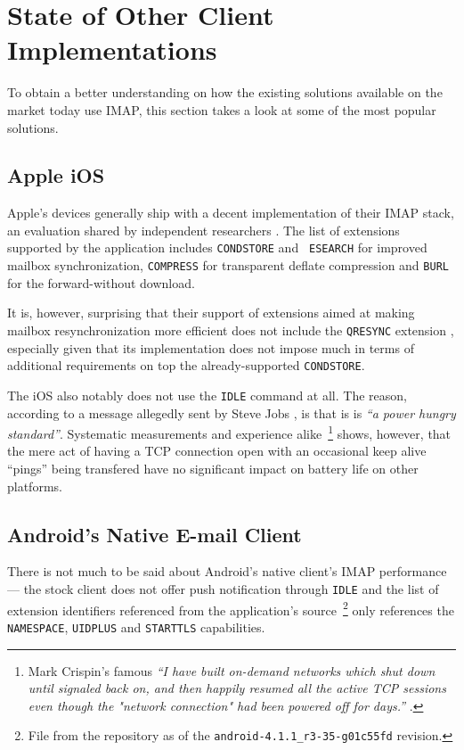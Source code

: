 \documentclass[trojita]{subfiles}
\begin{document}
\section{State of Other Client Implementations}

To obtain a better understanding on how the existing solutions available on the market today use IMAP, this section
takes a look at some of the most popular solutions.

\subsection{Apple iOS}

Apple's devices generally ship with a decent implementation of their IMAP stack, an evaluation shared by independent
researchers \cite{isode-iphone4}.  The list of extensions supported by the application includes {\tt CONDSTORE} and {\tt
ESEARCH} for improved mailbox synchronization, {\tt COMPRESS} for transparent deflate compression and {\tt BURL} for the
forward-without download.

It is, however, surprising that their support of extensions aimed at making mailbox resynchronization more efficient
does not include the {\tt QRESYNC} extension \cite{rfc5162}, especially given that its implementation does not impose
much in terms of additional requirements on top the already-supported {\tt CONDSTORE}.

The iOS also notably does not use the {\tt IDLE} command at all.  The reason, according to a message allegedly sent by
Steve Jobs \cite{jobs-ios-idle}, is that is is {\em ``a power hungry standard''}.  Systematic measurements
\cite{wcdma-energy} \cite{cridland-fach-dch-measurements} and experience alike~\footnote{Mark Crispin's famous {\em ``I
have built on-demand networks which shut down until signaled back on, and then happily resumed all the active TCP
sessions even though the "network connection" had been powered off for days.''} \cite{crispin-no-ifup}.} shows, however,
that the mere act of having a TCP connection open with an occasional keep alive ``pings'' being transfered have no
significant impact on battery life on other platforms.

\subsection{Android's Native E-mail Client}

There is not much to be said about Android's native client's IMAP performance --- the stock client does not offer push
notification through {\tt IDLE} \cite{android-idle} and the list of extension identifiers referenced from the
application's source~\footnote{File  from the
 repository as of the {\tt android-4.1.1\_r3-35-g01c55fd} revision.} only references
the {\tt NAMESPACE}, {\tt UIDPLUS} and {\tt STARTTLS} capabilities.
\end{document}
